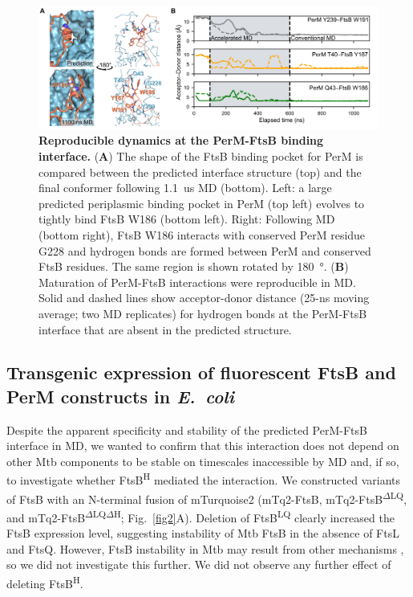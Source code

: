 \documentclass[pdflatex,sn-basic]{sn-jnl}%
\newcommand\ec{\textit{E.~coli}}
\newcommand\mtb{Mtb}
\newcommand\ftsbLQ{FtsB\textsuperscript{LQ}}
\newcommand\ftsbH{FtsB\textsuperscript{H}}
\newcommand\ftsbdLQ{FtsB\textsuperscript{$\Delta{}$LQ}}
\newcommand\ftsbdLQdH{FtsB\textsuperscript{$\Delta{}$LQ$\Delta{}$H}}
\begin{document}
\begin{figure}[h]
    \centering
    \includegraphics[width=1.0\textwidth]{../figures/fig1_2.png}
    \caption{
        \textbf{Reproducible dynamics at the PerM-FtsB binding interface.}
        (\textbf{A}) The shape of the FtsB binding pocket for PerM is compared between the predicted interface structure (top) and the final conformer following \qty{1.1}{us} MD (bottom). Left: a large predicted periplasmic binding pocket in PerM (top left) evolves to tightly bind FtsB W186 (bottom left). Right: Following MD (bottom right), FtsB W186 interacts with conserved PerM residue G228 and hydrogen bonds are formed between PerM and conserved FtsB residues. The same region is shown rotated by \qty{180}{\degree}.
        (\textbf{B}) Maturation of PerM-FtsB interactions were reproducible in MD. Solid and dashed lines show acceptor-donor distance (25-ns moving average; two MD replicates) for hydrogen bonds at the PerM-FtsB interface that are absent in the predicted structure.
    }\label{fig1_2}
\end{figure}

\subsection{Transgenic expression of fluorescent FtsB and PerM constructs in \ec{}}

Despite the apparent specificity and stability of the predicted PerM-FtsB interface in MD, we wanted to confirm that this interaction does not depend on other \mtb{} components to be stable on timescales inaccessible by MD and, if so, to investigate whether \ftsbH{} mediated the interaction.
We constructed variants of FtsB with an N-terminal fusion of mTurquoise2 (mTq2-FtsB, mTq2-\ftsbdLQ{}, and mTq2-\ftsbdLQdH{}; Fig.~\ref{fig2}A). Deletion of \ftsbLQ{} clearly increased the FtsB expression level, suggesting instability of \mtb{} FtsB in the absence of FtsL and FtsQ.
However, FtsB instability in \mtb{} may result from other mechanisms \citep{wangPersistentMycobacteriumTuberculosis2019}, so we did not investigate this further.
We did not observe any further effect of deleting \ftsbH{}.
\end{document}
